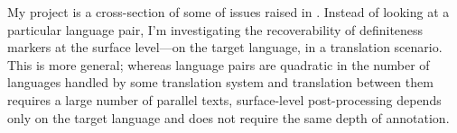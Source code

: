 \documentclass[11pt]{article}
\begin{document}
My project is a cross-section of some of issues raised in \citet{siegel:1996}. Instead of looking at a particular language pair, I'm investigating the recoverability of definiteness markers at the surface level---on the target language, in a translation scenario. This is more general; whereas language pairs are quadratic in the number of languages handled by some translation system and translation between them requires a large number of parallel texts, surface-level post-processing depends only on the target language and does not require the same depth of annotation.




\end{document}
